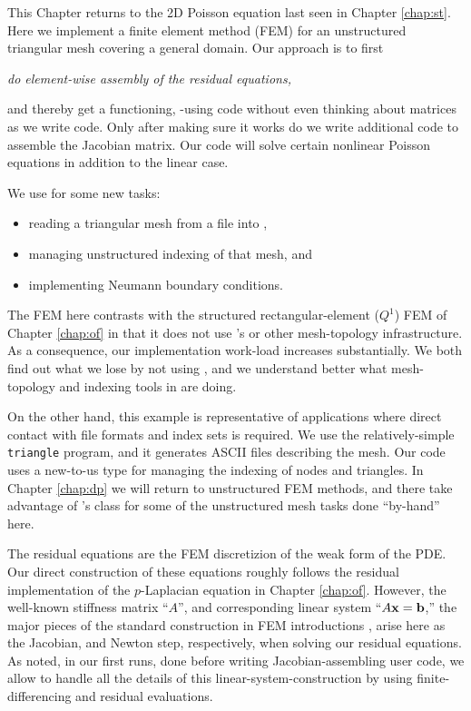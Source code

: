 
This Chapter returns to the 2D Poisson equation last seen in Chapter \ref{chap:st}.  Here we implement a finite element method (FEM) for an unstructured triangular mesh covering a general domain.  Our approach is to first
\begin{center}
\emph{do element-wise assembly of the residual equations,}
\end{center}
and thereby get a functioning, \pSNES-using code without even thinking about matrices as we write code.  Only after making sure it works do we write additional code to assemble the Jacobian matrix.  Our code will solve certain nonlinear Poisson equations in addition to the linear case.

We use \PETSc for some new tasks:
\begin{itemize}
\item reading a triangular mesh from a file into \PETSc \pVecs,
\item managing unstructured indexing of that mesh, and
\item implementing Neumann boundary conditions.
\end{itemize}

The FEM here contrasts with the structured rectangular-element ($Q^1$) FEM of Chapter \ref{chap:of} in that it does not use \PETSc's \pDMDA or other mesh-topology infrastructure.  As a consequence, our implementation work-load increases substantially.  We both find out what we lose by not using \pDMDA, and we understand better what mesh-topology and indexing tools in \PETSc are doing.

On the other hand, this example is representative of \PETSc applications where direct contact with file formats and index sets is required.  We use the relatively-simple \texttt{triangle} program, and it generates ASCII files describing the mesh.  Our code uses a new-to-us \PETSc \pIS type for managing the indexing of nodes and triangles.  In Chapter \ref{chap:dp} we will return to unstructured FEM methods, and there take advantage of \PETSc's \pDMPlex class for some of the unstructured mesh tasks done ``by-hand'' here.

The residual equations are the FEM discretizion of the weak form of the PDE.  Our direct construction of these equations roughly follows the residual implementation of the $p$-Laplacian equation in Chapter \ref{chap:of}.  However, the well-known stiffness matrix ``$A$'', and corresponding linear system ``$A\mathbf{x} = \mathbf{b}$,'' the major pieces of the standard construction in FEM introductions \citep{Braess2007,Elmanetal2005}, arise here as the Jacobian, and Newton step, respectively, when solving our residual equations.  As noted, in our first runs, done before writing Jacobian-assembling user code, we allow \PETSc \pSNES to handle all the details of this linear-system-construction by using finite-differencing and residual evaluations.

